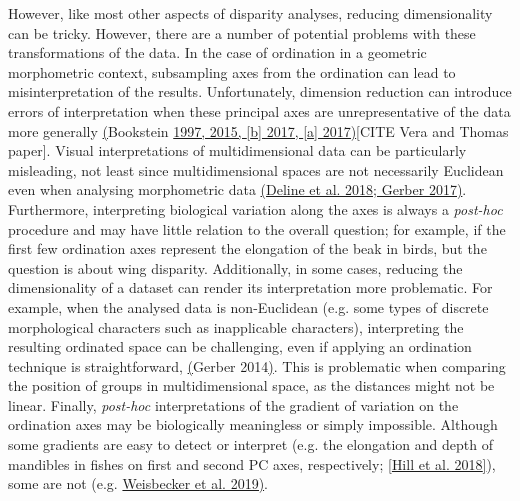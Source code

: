 \documentclass[12pt,letterpaper]{article}
\begin{document}
However, like most other aspects of disparity analyses, reducing dimensionality can be tricky.
However, there are a number of potential problems with these transformations of the data.
In the case of ordination in a geometric morphometric context, subsampling axes from the ordination can lead to misinterpretation of the results. %
Unfortunately, dimension reduction can introduce errors of interpretation when these principal axes are unrepresentative of the data more generally \href{https://paperpile.com/c/sTGYvp/1SD2+sN5d+xaUx+o4w7}{(}Bookstein \href{https://paperpile.com/c/sTGYvp/1SD2+sN5d+xaUx+o4w7}{1997, 2015, {[}b{]} 2017, {[}a{]} 2017)}{[}CITE Vera and Thomas paper{]}. %
Visual interpretations of multidimensional data can be particularly misleading, not least since multidimensional spaces are not necessarily Euclidean even when analysing morphometric data \href{https://paperpile.com/c/sTGYvp/0y4V+QVvv}{(Deline et al. 2018; Gerber 2017)}.
Furthermore, interpreting biological variation along the axes is always a \emph{post-hoc} procedure and may have little relation to the overall question; for example, if the first few ordination axes represent the elongation of the beak in birds, but the question is about wing disparity.
Additionally, in some cases, reducing the dimensionality of a dataset can render its interpretation more problematic.
For example, when the analysed data is non-Euclidean (e.g. some types of discrete morphological characters such as inapplicable characters), interpreting the resulting ordinated space can be challenging, even if applying an ordination technique is straightforward, \href{https://paperpile.com/c/sTGYvp/SJbC}{(}Gerber 2014\href{https://paperpile.com/c/sTGYvp/SJbC}{)}. %
This is problematic when comparing the position of groups in multidimensional space, as the distances might not be linear.
Finally, \emph{post-hoc} interpretations of the gradient of variation on the ordination axes may be biologically meaningless or simply impossible. %
Although some gradients are easy to detect or interpret (e.g. the elongation and depth of mandibles in fishes on first and second PC axes, respectively; {[}\href{https://paperpile.com/c/sTGYvp/3JPy}{Hill et al. 2018{]}}), some are not (e.g. \href{https://paperpile.com/c/sTGYvp/TZzO}{Weisbecker et al. 2019)}.
\end{document}

